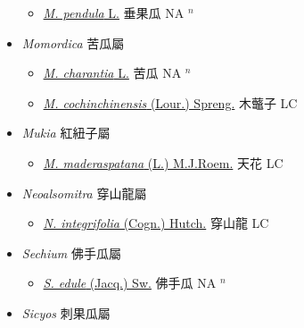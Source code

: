 \begin{itemize}
  \begin{itemize}
        \item[] \href{http://www.theplantlist.org/tpl1.1/search?q=Melothria+pendula}{\textit{M. pendula} L.}   垂果瓜 NA $^n$
  \end{itemize}
 \item[] \textit{Momordica} 苦瓜屬
                    
  \begin{itemize}
        \item[] \href{http://www.theplantlist.org/tpl1.1/search?q=Momordica+charantia}{\textit{M. charantia} L.}   苦瓜 NA $^n$
        \item[] \href{http://www.theplantlist.org/tpl1.1/search?q=Momordica+cochinchinensis}{\textit{M. cochinchinensis} (Lour.) Spreng.}   木虌子 LC
  \end{itemize}
 \item[] \textit{Mukia} 紅紐子屬
                    
  \begin{itemize}
        \item[] \href{http://www.theplantlist.org/tpl1.1/search?q=Mukia+maderaspatana}{\textit{M. maderaspatana} (L.) M.J.Roem.}   天花 LC
  \end{itemize}
 \item[] \textit{Neoalsomitra} 穿山龍屬
                    
  \begin{itemize}
        \item[] \href{http://www.theplantlist.org/tpl1.1/search?q=Neoalsomitra+integrifolia}{\textit{N. integrifolia} (Cogn.) Hutch.}   穿山龍 LC
  \end{itemize}
 \item[] \textit{Sechium} 佛手瓜屬
                    
  \begin{itemize}
        \item[] \href{http://www.theplantlist.org/tpl1.1/search?q=Sechium+edule}{\textit{S. edule} (Jacq.) Sw.}   佛手瓜 NA $^n$
  \end{itemize}
 \item[] \textit{Sicyos} 刺果瓜屬
                    

\end{itemize}
